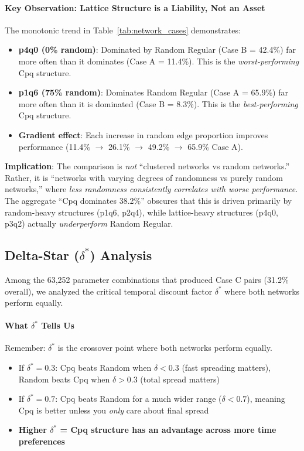 \documentclass[12pt,a4paper]{article}
\begin{document}
\paragraph{Key Observation: Lattice Structure is a Liability, Not an Asset}

The monotonic trend in Table~\ref{tab:network_cases} demonstrates:
\begin{itemize}
    \item \textbf{p4q0 (0\% random)}: Dominated by Random Regular (Case B = 42.4\%) far more often than it dominates (Case A = 11.4\%). This is the \textit{worst-performing} Cpq structure.

    \item \textbf{p1q6 (75\% random)}: Dominates Random Regular (Case A = 65.9\%) far more often than it is dominated (Case B = 8.3\%). This is the \textit{best-performing} Cpq structure.

    \item \textbf{Gradient effect}: Each increase in random edge proportion improves performance (11.4\% $\to$ 26.1\% $\to$ 49.2\% $\to$ 65.9\% Case A).
\end{itemize}

\textbf{Implication}: The comparison is \textit{not} ``clustered networks vs random networks.'' Rather, it is ``networks with varying degrees of randomness vs purely random networks,'' where \textit{less randomness consistently correlates with worse performance}. The aggregate ``Cpq dominates 38.2\%'' obscures that this is driven primarily by random-heavy structures (p1q6, p2q4), while lattice-heavy structures (p4q0, p3q2) actually \textit{underperform} Random Regular.

\subsection{Delta-Star (\texorpdfstring{$\delta^*$}{delta*}) Analysis}

Among the 63,252 parameter combinations that produced Case C pairs (31.2\% overall), we analyzed the critical temporal discount factor $\delta^*$ where both networks perform equally.

\paragraph{What $\delta^*$ Tells Us}

Remember: $\delta^*$ is the crossover point where both networks perform equally.
\begin{itemize}
    \item If $\delta^* = 0.3$: Cpq beats Random when $\delta < 0.3$ (fast spreading matters), Random beats Cpq when $\delta > 0.3$ (total spread matters)
    \item If $\delta^* = 0.7$: Cpq beats Random for a much wider range ($\delta < 0.7$), meaning Cpq is better unless you \textit{only} care about final spread
    \item \textbf{Higher $\delta^*$ = Cpq structure has an advantage across more time preferences}
\end{itemize}
\end{document}
